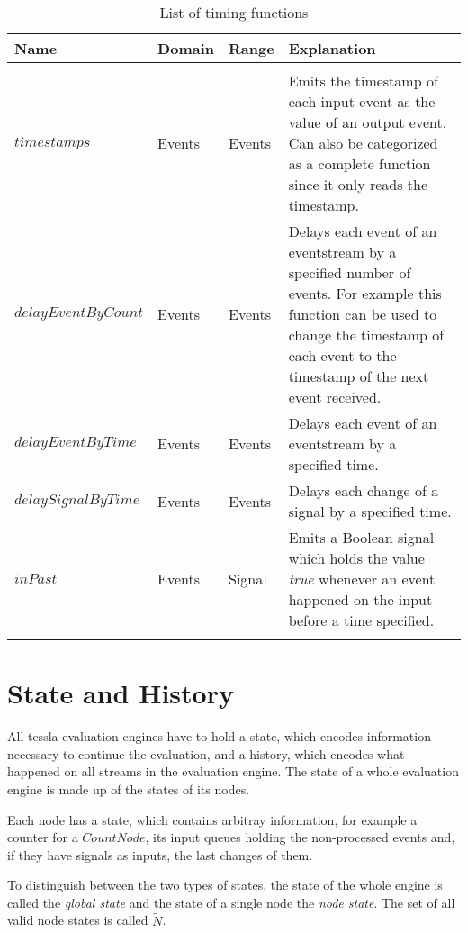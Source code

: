 \begin{longtable}{lp{3cm}lp{6cm}}
  Name                 & Domain                    & Range   & Explanation \\
  \toprule \\
  \endhead{}
  \(\mathit{timestamps}\)               & Events & Events  & Emits the timestamp of each input event as the value of an output event. Can also be categorized as a complete function since it only reads the timestamp. \\
  \(\mathit{delayEventByCount}\)        & Events & Events  & Delays each event of an eventstream by a specified number of events. For example this function can be used to change the timestamp of each event to the timestamp of the next event received.\\
  \(\mathit{delayEventByTime}\)         & Events & Events  & Delays each event of an eventstream by a specified time. \\
  \(\mathit{delaySignalByTime}\)        & Events & Events  & Delays each change of a signal by a specified time. \\
  \(\mathit{inPast}\)                   & Events & Signal  & Emits a Boolean signal which holds the value \emph{true} whenever an event happened on the input before a time specified.\\
  \caption{List of timing functions}
\label{table:timing_functions}
\end{longtable}

\section{State and History}
\label{sec:definitions:state}

All \gls{tessla} evaluation engines have to hold a state, which encodes information necessary to continue the evaluation, and a history, which encodes what happened on all streams in the evaluation engine.
The state of a whole evaluation engine is made up of the states of its nodes.

Each node has a state, which contains arbitray information, for example a counter for a \(\mathit{CountNode}\), its input queues holding the non-processed events and, if they have signals as inputs, the last changes of them.

To distinguish between the two types of states, the state of the whole engine is called the \emph{global state} and the state of a single node the \emph{node state}.
The set of all valid node states is called \(\widetilde{N}\).

